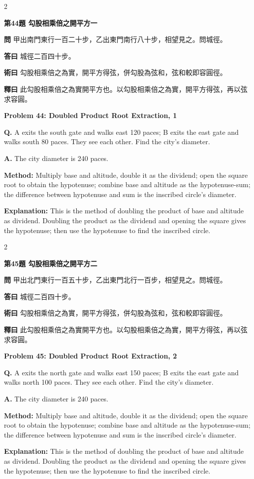 \documentclass[11pt,a4paper]{article}
\newcommand{\wen}[1]{\noindent\textbf{問} #1\par\smallskip}
\newcommand{\da}[1]{\noindent\textbf{答曰} #1\par\smallskip}
\newcommand{\shu}[1]{\noindent\textbf{術曰} #1\par\smallskip}
\newcommand{\shi}[1]{\noindent\textbf{釋曰} #1\par\smallskip}
\newcommand{\wenE}[1]{\noindent\textbf{Q.} #1\par\smallskip}
\newcommand{\daE}[1]{\noindent\textbf{A.} #1\par\smallskip}
\newcommand{\shuE}[1]{\noindent\textbf{Method:} #1\par\smallskip}
\newcommand{\shiE}[1]{\noindent\textbf{Explanation:} #1\par\smallskip}
\begin{document}
\bigskip

\begin{paracol}{2}

\noindent\textbf{第44題 勾股相乘倍之開平方一}

\wen{甲出南門東行一百二十步，乙出東門南行八十步，相望見之。問城徑。}
\da{城徑二百四十步。}
\shu{勾股相乘倍之為實，開平方得弦，併勾股為弦和，弦和較即容圓徑。}
\shi{此勾股相乘倍之為實開平方也。以勾股相乘倍之為實，開平方得弦，再以弦求容圓。}

\switchcolumn

\noindent\textbf{Problem 44: Doubled Product Root Extraction, 1}

\wenE{A exits the south gate and walks east 120 paces; B exits the east gate and walks south 80 paces. They see each other. Find the city's diameter.}
\daE{The city diameter is 240 paces.}
\shuE{Multiply base and altitude, double it as the dividend; open the square root to obtain the hypotenuse; combine base and altitude as the hypotenuse-sum; the difference between hypotenuse and sum is the inscribed circle's diameter.}
\shiE{This is the method of doubling the product of base and altitude as dividend. Doubling the product as the dividend and opening the square gives the hypotenuse; then use the hypotenuse to find the inscribed circle.}

\end{paracol}

\bigskip

\begin{paracol}{2}

\noindent\textbf{第45題 勾股相乘倍之開平方二}

\wen{甲出北門東行一百五十步，乙出東門北行一百步，相望見之。問城徑。}
\da{城徑二百四十步。}
\shu{勾股相乘倍之為實，開平方得弦，併勾股為弦和，弦和較即容圓徑。}
\shi{此勾股相乘倍之為實開平方也。以勾股相乘倍之為實，開平方得弦，再以弦求容圓。}

\switchcolumn

\noindent\textbf{Problem 45: Doubled Product Root Extraction, 2}

\wenE{A exits the north gate and walks east 150 paces; B exits the east gate and walks north 100 paces. They see each other. Find the city's diameter.}
\daE{The city diameter is 240 paces.}
\shuE{Multiply base and altitude, double it as the dividend; open the square root to obtain the hypotenuse; combine base and altitude as the hypotenuse-sum; the difference between hypotenuse and sum is the inscribed circle's diameter.}
\shiE{This is the method of doubling the product of base and altitude as dividend. Doubling the product as the dividend and opening the square gives the hypotenuse; then use the hypotenuse to find the inscribed circle.}

\end{paracol}
\end{document}

